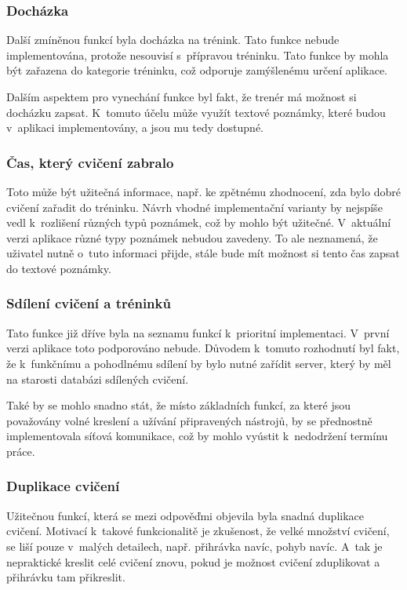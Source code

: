 \documentclass[thesis=B,czech]{FITthesis}[2012/06/26]
\begin{document}
\subsubsection{Docházka}

	Další zmíněnou funkcí byla docházka na trénink. Tato funkce nebude implementována, protože nesouvisí s~přípravou tréninku. Tato funkce by mohla být zařazena do kategorie  tréninku, což odporuje zamýšlenému určení aplikace.

	Dalším aspektem pro vynechání funkce byl fakt, že trenér má možnost si docházku zapsat. K~tomuto účelu může využít textové poznámky, které budou v~aplikaci implementovány, a jsou mu tedy dostupné.

\subsubsection{Čas, který cvičení zabralo}

	Toto může být užitečná informace, např. ke zpětnému zhodnocení, zda bylo dobré cvičení zařadit do tréninku. Návrh vhodné implementační varianty by nejspíše vedl k~rozlišení různých typů poznámek, což by mohlo být užitečné. V~aktuální verzi aplikace různé typy poznámek nebudou zavedeny. To ale neznamená, že uživatel nutně o~tuto informaci přijde, stále bude mít možnost si tento čas zapsat do textové poznámky.

\subsubsection{Sdílení cvičení a tréninků}

	Tato funkce již dříve byla na seznamu funkcí k~prioritní implementaci. V~první verzi aplikace toto podporováno nebude. Důvodem k~tomuto rozhodnutí byl fakt, že k~funkčnímu a pohodlnému sdílení by bylo nutné zařídit server, který by měl na starosti databázi sdílených cvičení.

	Také by se mohlo snadno stát, že místo základních funkcí, za které jsou považovány volné kreslení a užívání připravených nástrojů, by se přednostně implementovala síťová komunikace, což by mohlo vyústit k~nedodržení termínu práce.

\subsubsection{Duplikace cvičení}

	Užitečnou funkcí, která se mezi odpověďmi objevila byla snadná duplikace cvičení. Motivací k~takové funkcionalitě je zkušenost, že velké množství cvičení, se liší pouze v~malých detailech, např. přihrávka navíc, pohyb navíc. A~tak je nepraktické kreslit celé cvičení znovu, pokud je možnost cvičení zduplikovat a přihrávku tam přikreslit.
\end{document}
